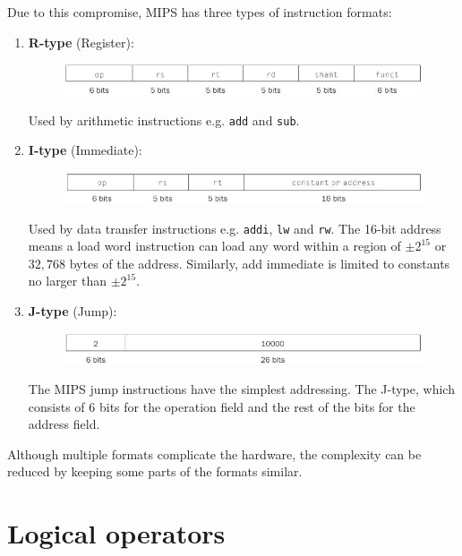\documentclass[10pt,a4paper]{article}
\begin{document}
Due to this compromise, MIPS has three types of instruction formats:
\begin{enumerate}
    \item \textbf{R-type} (Register): \par
    \begin{figure} [h!]
        \centering
        \includegraphics[scale=0.6]{R-type.JPG}
    \end{figure}
    Used by arithmetic instructions e.g. \texttt{add} and \texttt{sub}.
    \item \textbf{I-type} (Immediate): \par
    \begin{figure} [h!]
        \centering
        \includegraphics[scale=0.6]{I-type.JPG}
    \end{figure}
    Used by data transfer instructions e.g. \texttt{addi}, \texttt{lw} and \texttt{rw}. The 16-bit
    address means a load word instruction can load any word within a region of $\pm 2^{15}$ or $32,768$
    bytes of the address. Similarly, add immediate is limited to constants no larger than $\pm 2^{15}$. 
    \item \textbf{J-type} (Jump): \par
    \begin{figure} [h!]
        \centering
        \includegraphics[scale=0.6]{J-type.JPG}
    \end{figure}
    The MIPS jump instructions have the simplest addressing. The J-type, which consists of $6$ bits for the operation field and the rest of the bits for the address field.
\end{enumerate}

Although multiple formats complicate the hardware, the complexity can be reduced by keeping some
parts of the formats similar.

\section{Logical operators}
\end{document}
